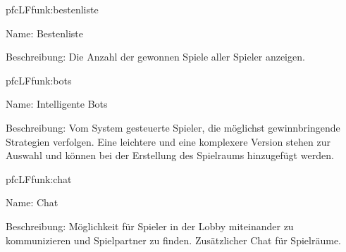 \begin{description}[leftmargin=5em, style=sameline]
	\begin{lhp}{pfc}{LF}{funk:bestenliste}
		\item [Name:] Bestenliste
		\item [Beschreibung:] Die Anzahl der gewonnen Spiele aller Spieler anzeigen.
	\end{lhp}
	
	\begin{lhp}{pfc}{LF}{funk:bots}
		\item [Name:] Intelligente Bots
		\item [Beschreibung:] Vom System gesteuerte Spieler, die möglichst gewinnbringende Strategien verfolgen. Eine leichtere und eine komplexere Version stehen zur Auswahl und können bei der Erstellung des Spielraums hinzugefügt werden.
	\end{lhp}
	
	\begin{lhp}{pfc}{LF}{funk:chat}
		\item [Name:] Chat
		\item [Beschreibung:] Möglichkeit für Spieler in der Lobby miteinander zu kommunizieren und Spielpartner zu finden. Zusätzlicher Chat für Spielräume.
	\end{lhp}

\end{description}


